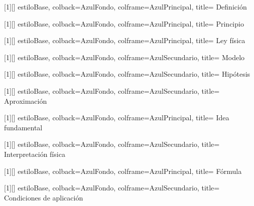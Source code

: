 ﻿%

[1][]{
    estiloBase,
    colback=AzulFondo,
    colframe=AzulPrincipal,
    title={
        Definición
    }
}

[1][]{
    estiloBase,
    colback=AzulFondo,
    colframe=AzulPrincipal,
    title={
        Principio
    }
}

[1][]{
    estiloBase,
    colback=AzulFondo,
    colframe=AzulPrincipal,
    title={
        Ley física
    }
}

[1][]{
    estiloBase,
    colback=AzulFondo,
    colframe=AzulSecundario,
    title={
        Modelo
    }
}

[1][]{
    estiloBase,
    colback=AzulFondo,
    colframe=AzulSecundario,
    title={
        Hipótesis
    }
}

[1][]{
    estiloBase,
    colback=AzulFondo,
    colframe=AzulSecundario,
    title={
        Aproximación
    }
}



[1][]{
    estiloBase,
    colback=AzulFondo,
    colframe=AzulPrincipal,
    title={
        Idea fundamental
    }
}

[1][]{
    estiloBase,
    colback=AzulFondo,
    colframe=AzulSecundario,
    title={
        Interpretación física
    }
}

[1][]{
    estiloBase,
    colback=AzulFondo,
    colframe=AzulPrincipal,
    title={
        Fórmula
    }
}

[1][]{
    estiloBase,
    colback=AzulFondo,
    colframe=AzulSecundario,
    title={
        Condiciones de aplicación
    }
}



